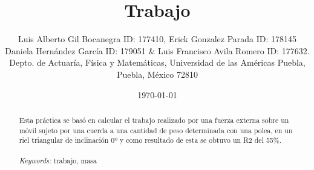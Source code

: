\documentclass{article}
\begin{document}

\renewcommand{\footrulewidth}{1pt}
\renewcommand{\tablename}{Tabla}
\renewcommand{\figurename}{Figura}


\title{Trabajo}
\author{\small{Luis Alberto Gil Bocanegra ID: 177410, Erick Gonzalez Parada ID: 178145}\\
 \small{Daniela Hernández García ID: 179051 $\&$ Luis Francisco Avila Romero ID: 177632.}\\		%
	   \small{Depto. de Actuaría, Física y Matemáticas, Universidad de las Américas Puebla, Puebla, M\'exico 72810}}
\date{\small{\today}}

\maketitle


\begin{abstract}
Esta práctica se basó en calcular el trabajo realizado por una fuerza externa sobre un móvil sujeto por una cuerda a una cantidad de peso determinada con una polea, en un riel triangular de inclinación 0º y como resultado de esta se obtuvo un R2 del 55$\%$.
\\
\\
{\it Keywords:}  trabajo, masa  
\\
\\
\end{abstract}
\end{document}
